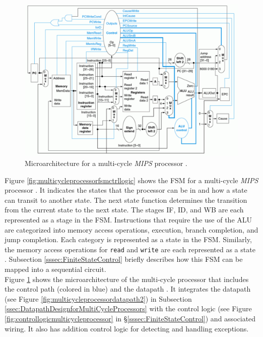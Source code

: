 \begin{figure}[h]
\centering 
\includegraphics[width=6in]{./pics/multi-cycle-processor}
\caption{Microarchitecture for a multi-cycle {\it MIPS} processor \cite{Patterson2005}.}
\label{fig:multicycleprocessor}
\end{figure}



Figure \ref{fig:multicycleprocessorfsmctrllogic} shows the FSM for a multi-cycle {\it MIPS} processor \cite{Patterson2005,Patterson2005a}. It indicates the states that the processor can be in and how a state can transit to another state. The next state function determines the transition from the current state to the next state. The stages IF, ID, and WB are each represented as a stage in the FSM. Instructions that require the use of the ALU are categorized into memory access operations, execution, branch completion, and jump completion. Each category is represented as a state in the FSM. Similarly, the memory access operations for {\tt read} and {\tt write} are each represented as a state \cite{Patterson2005}. Subsection \ref{sssec:FiniteStateControl} briefly describes how this FSM can be mapped into a sequential circuit. \\

Figure \ref{fig:multicycleprocessor} shows the microarchitecture of the multi-cycle processor that includes the control path (colored in blue) and the datapath \cite{Patterson2005}. It integrates the datapath (see Figure \ref{fig:multicycleprocessordatapath2}) in Subsection \ref{ssec:DatapathDesignforMultiCycleProcessors} with the control logic (see Figure \ref{fig:controllogicmulticycleprocessor} in \S\ref{sssec:FiniteStateControl}) and associated wiring. It also has addition control logic for detecting and handling exceptions.








